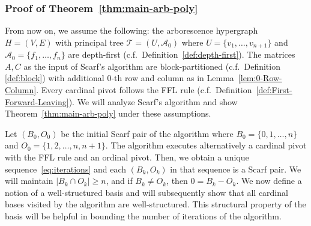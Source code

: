 \documentclass[11pt]{article}
\begin{document}
\subsubsection{Proof of Theorem~\ref{thm:main-arb-poly}}\label{sec:run-time}





From now on, we assume the following: the arborescence hypergraph $H=(V,E)$ with principal tree $\mathcal{T}=(U,\mathcal{A}_0)$ where $U=\{v_1,\dots,v_{n+1}\}$ and $\mathcal{A}_0=\{f_1,\dots,f_n\}$ are depth-first (c.f.~Definition~\ref{def:depth-first}). The matrices $A,C$ as the input of Scarf's algorithm are block-partitioned (c.f.~Definition \ref{def:block}) with additional $0$-th row and column as in Lemma~\ref{lem:0-Row-Column}. Every cardinal pivot follows the FFL rule (c.f.~Definition~\ref{def:First-Forward-Leaving}). We will analyze Scarf's algorithm and show Theorem~\ref{thm:main-arb-poly} under these assumptions.

Let $(B_0,O_0)$ be the initial Scarf pair of the algorithm where $B_0=\{0,1,\dots,n\}$ and $O_0=\{1,2,\dots,n,n+1\}$. The algorithm executes alternatively a cardinal pivot with the FFL rule and an ordinal pivot. Then, we obtain a unique sequence~\eqref{eq:iterations} and each $(B_k,O_k)$ in that sequence is a Scarf pair. We will maintain $|B_k\cap O_k|\ge n$, and if $B_k\neq O_k$, then $0=B_k-O_k$. We now define a notion of a well-structured basis and will subsequently show that all cardinal bases visited by the algorithm 
are well-structured. 
This structural property of the basis will be helpful in bounding the number of iterations of the algorithm. 
\end{document}
